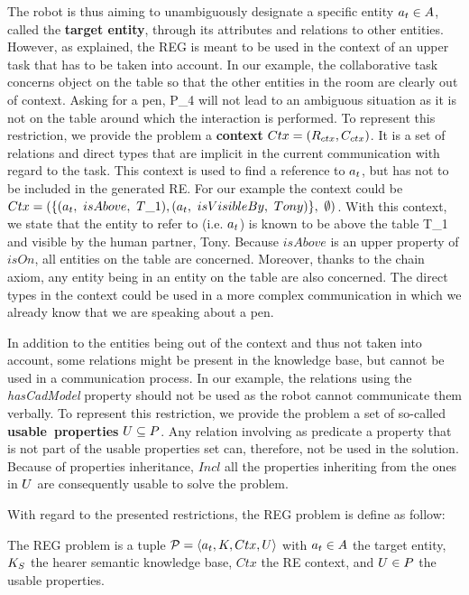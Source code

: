 The robot is thus aiming to unambiguously designate a specific entity $a_t \in A$, called the \textbf{target entity}, through its attributes and relations to other entities. However, as explained, the REG is meant to be used in the context of an upper task that has to be taken into account. In our example, the collaborative task concerns object on the table so that the other entities in the room are clearly out of context. Asking for a pen, P\_4 will not lead to an ambiguous situation as it is not on the table around which the interaction is performed. To represent this restriction, we provide the problem a \textbf{context} $Ctx = (R_{ctx}, C_{ctx})$. It is a set of relations and direct types that are implicit in the current communication with regard to the task. This context is used to find a reference to $a_t$, but has not to be included in the generated RE. For our example the context could be $Ctx = (\{ (a_t,\ isAbove,\ T\_1), (a_t,\ isVisibleBy,\ Tony) \},\ \emptyset)$. With this context, we state that the entity to refer to (i.e. $a_t$) is known to be above the table T\_1 and visible by the human partner, Tony. Because $isAbove$ is an upper property of $isOn$, all entities on the table are concerned. Moreover, thanks to the chain axiom, any entity being in an entity on the table are also concerned. The direct types in the context could be used in a more complex communication in which we already know that we are speaking about a pen.

In addition to the entities being out of the context and thus not taken into account, some relations might be present in the knowledge base, but cannot be used in a communication process. In our example, the relations using the \textit{hasCadModel} property should not be used as the robot cannot communicate them verbally. To represent this restriction, we provide the problem a set of so-called \mbox{\textbf{usable properties}} $U \subseteq P$. Any relation involving as predicate a property that is not part of the usable properties set can, therefore, not be used in the solution. Because of properties inheritance, $Incl$ all the properties inheriting from the ones in $U$ are consequently usable to solve the problem. 


With regard to the presented restrictions, the REG problem is define as follow:

\begin{definition}
The REG problem is a tuple $\mathcal{P} = \langle a_t, K, Ctx, U \rangle$ with $a_t \in A$ the target entity, $K_S$ the hearer semantic knowledge base, $Ctx$ the RE context, and $U \in P$ the usable properties.
\end{definition}

